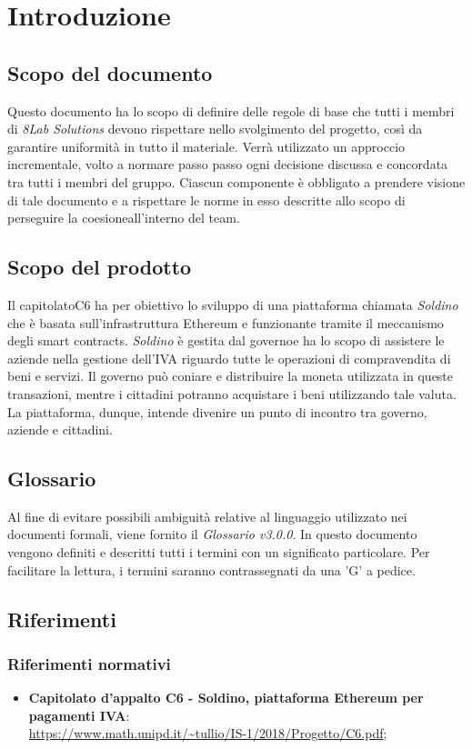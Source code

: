 \section{Introduzione}
\subsection{Scopo del documento}
Questo documento ha lo scopo di definire delle regole di base che tutti i membri 
di \textit{8Lab Solutions} devono rispettare nello svolgimento del progetto, 
così da garantire uniformità in tutto il materiale. Verrà utilizzato un 
approccio incrementale, volto a normare passo passo ogni decisione discussa e 
concordata tra tutti i membri del gruppo. Ciascun componente è obbligato a 
prendere visione di tale documento e a rispettare le norme in esso descritte 
allo scopo di perseguire la coesione\glosp all'interno del team.

\subsection{Scopo del prodotto}
Il capitolato\glosp C6 ha per obiettivo lo sviluppo di una piattaforma chiamata \textit{Soldino} che è basata sull'infrastruttura Ethereum\glo{} e funzionante tramite il meccanismo degli smart contracts\glo{}. \textit{Soldino} è gestita dal governo\glosp e ha lo scopo di assistere le aziende nella gestione dell'IVA riguardo tutte le operazioni di compravendita di beni e servizi. Il governo può coniare e 
distribuire la moneta utilizzata in queste transazioni, mentre i cittadini 
potranno acquistare i beni utilizzando tale valuta. La piattaforma, dunque, 
intende divenire un punto di incontro tra governo, aziende e cittadini.

\subsection{Glossario}
Al fine di evitare possibili ambiguità relative al linguaggio utilizzato nei 
documenti formali, viene fornito il \textit{Glossario v3.0.0}. In questo 
documento vengono definiti e descritti tutti i termini con un significato 
particolare. Per facilitare la lettura, i termini saranno contrassegnati da una 
'G' a pedice.

\subsection{Riferimenti}
\subsubsection{Riferimenti normativi}
\begin{itemize}

	\item \textbf{Capitolato d'appalto C6 - Soldino, piattaforma Ethereum per pagamenti IVA}: \\
		\url{https://www.math.unipd.it/~tullio/IS-1/2018/Progetto/C6.pdf};
\end{itemize}

